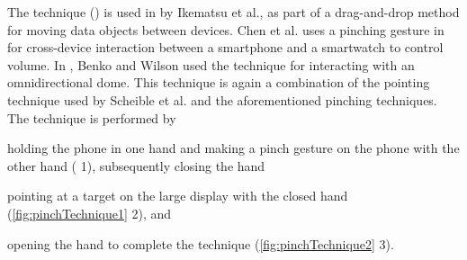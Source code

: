 The \pinch technique () is used in \cite{Ikematsu:2015} by Ikematsu et al., as part of a drag-and-drop method for moving data objects between devices.
Chen et al. uses a pinching gesture in \cite{Chen:2014} for cross-device interaction between a smartphone and a smartwatch to control volume. 
In \cite{Benko:2010}, Benko and Wilson used the \pinch technique for interacting with an omnidirectional dome.
This technique is again a combination of the pointing technique used by Scheible et al. and the aforementioned pinching techniques. 
The \pinch technique is performed by 
\begin{enumerate*}[label=\itshape\roman*\upshape)]
	\item{holding the phone in one hand and making a pinch gesture on the phone with the other hand ( 1), subsequently closing the hand}
	\item{pointing at a target on the large display with the closed hand (\cref{fig:pinchTechnique1} 2), and}
	\item{opening the hand to complete the technique (\cref{fig:pinchTechnique2} 3).}
\end{enumerate*}

